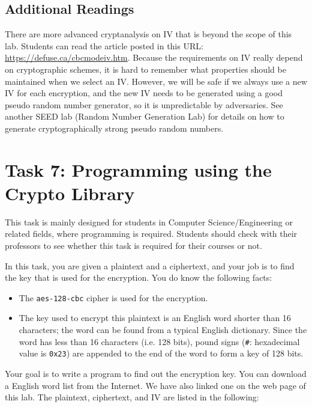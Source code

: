 \subsection{Additional Readings}

There are more advanced cryptanalysis on IV that is beyond the scope of this lab. Students 
can read the article posted in this URL: \url{https://defuse.ca/cbcmodeiv.htm}. 
Because the requirements on IV really depend on cryptographic schemes, it is hard to
remember what properties should be maintained when we select an IV.
However, we will be safe if we always use a new IV for each encryption, and the 
new IV needs to be generated using a good pseudo random number 
generator, so it is unpredictable by adversaries. 
See another SEED lab (Random Number Generation Lab) for 
details on how to generate cryptographically strong pseudo random numbers. 



\section{Task 7: Programming using the Crypto Library}

This task is mainly designed for students in Computer Science/Engineering
or related fields, where programming is required. Students should
check with their professors to see whether this task is required 
for their courses or not.


In this task, you are given a plaintext and a ciphertext, and 
your job is to find the key that is used for the encryption. 
You do know the following facts:

\begin{itemize} 
\item The {\tt aes-128-cbc} cipher is used for the encryption. 
\item The key used to encrypt this plaintext is an English
word shorter than 16 characters; the word can be found from a typical 
English dictionary.  Since the word has less than 16 characters (i.e. 128
bits), pound signs (\texttt{\#}: hexadecimal value is \texttt{0x23}) 
are appended to the end of the word to form a key of 128 bits.
\end{itemize} 
  

Your goal is to write a program to 
find out the encryption key. You can download a English word list 
from the Internet.  We have also linked one on the web page
of this lab. The plaintext, ciphertext, and IV are listed
in the following:


